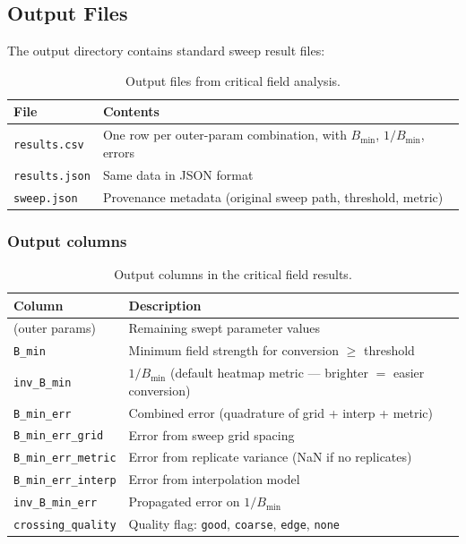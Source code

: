 \subsection{Output Files}
\label{sec:cf-output}

The output directory contains standard sweep result files:

\begin{table}[htbp]
\centering
\caption{Output files from critical field analysis.}
\label{tab:cf-output-files}
\begin{tabular}{@{}lp{9cm}@{}}
\toprule
File & Contents \\
\midrule
\texttt{results.csv}  & One row per outer-param combination, with $B_\text{min}$, $1/B_\text{min}$, errors \\
\texttt{results.json} & Same data in JSON format \\
\texttt{sweep.json}   & Provenance metadata (original sweep path, threshold, metric) \\
\bottomrule
\end{tabular}
\end{table}

\subsubsection{Output columns}
\label{sec:cf-columns}

\begin{table}[htbp]
\centering
\caption{Output columns in the critical field results.}
\label{tab:cf-columns}
\begin{tabular}{@{}lp{9cm}@{}}
\toprule
Column & Description \\
\midrule
(outer params)              & Remaining swept parameter values \\
\texttt{B\_min}             & Minimum field strength for conversion $\geq$ threshold \\
\texttt{inv\_B\_min}        & $1/B_\text{min}$ (default heatmap metric --- brighter $=$ easier conversion) \\
\texttt{B\_min\_err}        & Combined error (quadrature of grid + interp + metric) \\
\texttt{B\_min\_err\_grid}  & Error from sweep grid spacing \\
\texttt{B\_min\_err\_metric}& Error from replicate variance (NaN if no replicates) \\
\texttt{B\_min\_err\_interp}& Error from interpolation model \\
\texttt{inv\_B\_min\_err}   & Propagated error on $1/B_\text{min}$ \\
\texttt{crossing\_quality}  & Quality flag: \texttt{good}, \texttt{coarse}, \texttt{edge}, \texttt{none} \\
\bottomrule
\end{tabular}
\end{table}

